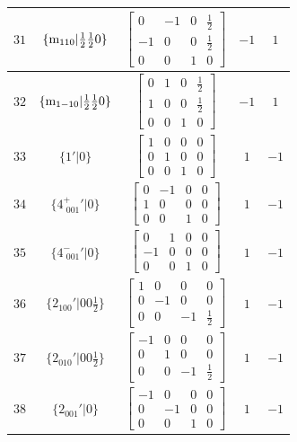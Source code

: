 \documentclass[fleqn,8pt]{jsarticle}
\begin{document}
\begin{longtable}{ccccc}
$ 31 $ & $ \{{\rm m}_{110}|\frac{1}{2} \frac{1}{2} 0\} $ & $ \begin{bmatrix} 0 & -1 & 0 & \frac{1}{2} \\ -1 & 0 & 0 & \frac{1}{2} \\ 0 & 0 & 1 & 0 \end{bmatrix} $ & $ -1 $ & $ 1 $ \\ \hline
$ 32 $ & $ \{{\rm m}_{1-10}|\frac{1}{2} \frac{1}{2} 0\} $ & $ \begin{bmatrix} 0 & 1 & 0 & \frac{1}{2} \\ 1 & 0 & 0 & \frac{1}{2} \\ 0 & 0 & 1 & 0 \end{bmatrix} $ & $ -1 $ & $ 1 $ \\ \hline
$ 33 $ & $ \{1{}'|0\} $ & $ \begin{bmatrix} 1 & 0 & 0 & 0 \\ 0 & 1 & 0 & 0 \\ 0 & 0 & 1 & 0 \end{bmatrix} $ & $ 1 $ & $ -1 $ \\ \hline
$ 34 $ & $ \{4^{+}_{\,\,001}{}'|0\} $ & $ \begin{bmatrix} 0 & -1 & 0 & 0 \\ 1 & 0 & 0 & 0 \\ 0 & 0 & 1 & 0 \end{bmatrix} $ & $ 1 $ & $ -1 $ \\ \hline
$ 35 $ & $ \{4^{-}_{\,\,001}{}'|0\} $ & $ \begin{bmatrix} 0 & 1 & 0 & 0 \\ -1 & 0 & 0 & 0 \\ 0 & 0 & 1 & 0 \end{bmatrix} $ & $ 1 $ & $ -1 $ \\ \hline
$ 36 $ & $ \{2{}_{100}{}'|0 0 \frac{1}{2}\} $ & $ \begin{bmatrix} 1 & 0 & 0 & 0 \\ 0 & -1 & 0 & 0 \\ 0 & 0 & -1 & \frac{1}{2} \end{bmatrix} $ & $ 1 $ & $ -1 $ \\ \hline
$ 37 $ & $ \{2{}_{010}{}'|0 0 \frac{1}{2}\} $ & $ \begin{bmatrix} -1 & 0 & 0 & 0 \\ 0 & 1 & 0 & 0 \\ 0 & 0 & -1 & \frac{1}{2} \end{bmatrix} $ & $ 1 $ & $ -1 $ \\ \hline
$ 38 $ & $ \{2{}_{001}{}'|0\} $ & $ \begin{bmatrix} -1 & 0 & 0 & 0 \\ 0 & -1 & 0 & 0 \\ 0 & 0 & 1 & 0 \end{bmatrix} $ & $ 1 $ & $ -1 $ \\ \hline

\end{longtable}
\end{document}
